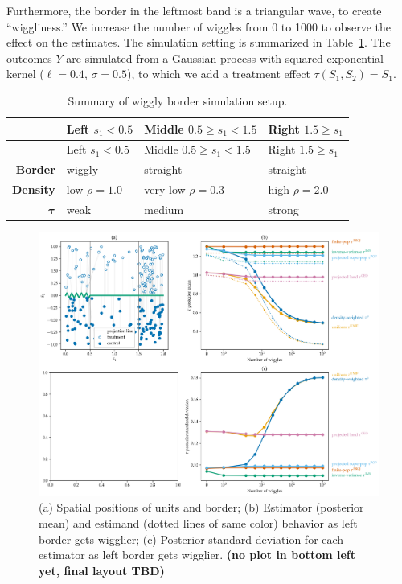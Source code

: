 \documentclass[letter]{article}
\makeatletter
\def\maxwidth{\ifdim\Gin@nat@width>\linewidth\linewidth
\else\Gin@nat@width\fi}
\let\Oldincludegraphics\includegraphics
\renewcommand{\includegraphics}[1]{\Oldincludegraphics[width=1.0\maxwidth]{#1}}
\newcommand{\taubold}{\bm{\tau}}
\makeatother
\begin{document}
Furthermore, the border in the leftmost band is a triangular wave, to create ``wiggliness.''
We increase the number of wiggles from 0 to 1000 to observe the effect on the estimates.
The simulation setting is summarized in Table~\ref{table:wiggly_setup}.
The outcomes \(Y\) are simulated from a Gaussian process with squared exponential kernel
(\(\ell=0.4\), \(\sigma=0.5\)), to which we add a treatment effect \(\tau(S_1, S_2) = S_1\).
    


    	\begin{longtable}[]{@{}rlll@{}}
\caption{Summary of wiggly border simulation setup. \label{table:wiggly_setup}}\tabularnewline
\toprule
& Left \(s_1< 0.5\) & Middle \(0.5 \ge s_1 < 1.5\) & Right \(1.5 \ge s_1\)\tabularnewline
\midrule
\endfirsthead
\toprule
& Left \(s_1< 0.5\) & Middle \(0.5 \ge s_1 < 1.5\) & Right \(1.5 \ge s_1\)\tabularnewline
\midrule
\endhead
\textbf{Border} & wiggly & straight & straight\tabularnewline
\textbf{Density} & low \(\rho=1.0\) & very low \(\rho=0.3\) & high \(\rho=2.0\)\tabularnewline
\(\taubold\) & weak & medium & strong\tabularnewline
\bottomrule
\end{longtable}
    


    	\begin{figure}
\centering
\includegraphics{../figures/wiggly_boundaries.png}
\caption{\label{fig:wiggly_boundaries} (a) Spatial positions of units and border; (b) Estimator (posterior mean) and estimand (dotted lines of same color) behavior as left border gets wigglier; (c) Posterior standard deviation for each estimator as left border gets wigglier. \textbf{(no plot in bottom left yet, final layout TBD)}}
\end{figure}
    
\end{document}
